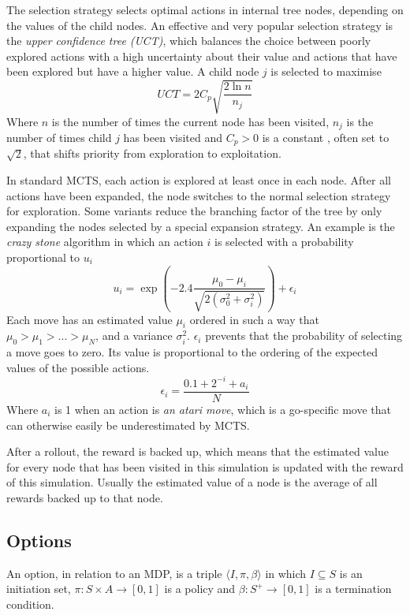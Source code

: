 The selection strategy selects optimal actions in internal tree nodes, depending
on the values of the child nodes. An effective and very popular selection
strategy is the \emph{upper confidence tree (UCT)}\cite{kocsis2006bandit}, which balances the choice 
between poorly explored actions with a high uncertainty about their value and
actions that have been explored but have a higher value. A child node $j$ is
selected to maximise
$$UCT = 2C_p \sqrt{\frac{2 \ln n}{n_j}}$$
Where $n$ is the number of times the current node has been visited, $n_j$ is the
number of times child $j$ has been visited and $C_p > 0$ is a constant , often
set to $\sqrt{2}$, that shifts priority from exploration to exploitation.
	
In standard MCTS, each action is explored at least once in each node. After all
actions have been expanded, the node switches to the normal selection strategy
for exploration. Some variants reduce the branching factor of the tree by only
expanding the nodes selected by a special expansion strategy. An example is the
\emph{crazy stone} algorithm\cite{coulom2007efficient} in which an action $i$ is selected with a
probability proportional to $u_i$
$$u_i = \exp\left(-2.4\frac{\mu_0 - \mu_i}{\sqrt{2\left(\sigma_0^2 +
\sigma_i^2\right)}}\right) + \epsilon_i$$
Each move has an estimated value $\mu_i$ ordered in such a way that $\mu_0 >
\mu_1 > ... > \mu_N$, and a variance $\sigma_i^2$. $\epsilon_i$ prevents that
the probability of selecting a move goes to zero. Its value is proportional to
the ordering of the expected values of the possible actions.
$$\epsilon_i = \frac{0.1 + 2^{-i} + a_i}{N}$$
Where $a_i$ is 1 when an action is \emph{an atari move}, which is a go-specific
move that can otherwise easily be underestimated by MCTS.

After a rollout, the reward is backed up, which means that the estimated value
for every node that has been visited in this simulation is updated with the
reward of this simulation. Usually the estimated value of a node is the average
of all rewards backed up to that node.

\subsection{Options}
\label{subsec:options}
An option, in relation to an MDP, is a triple $\langle I, \pi, \beta\rangle$ in
which $I \subseteq S$ is an initiation set, $\pi: S \times A \rightarrow [0, 1]$
is a policy and $\beta: S^+ \rightarrow[0,1]$ is a termination
condition.\cite{sutton1999between}

